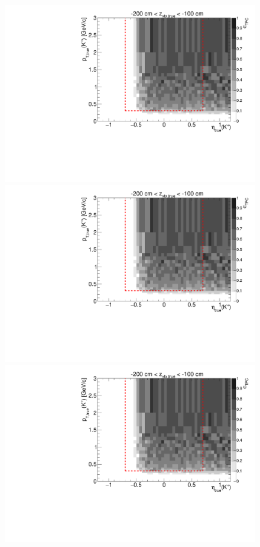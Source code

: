 \begin{figure}[hb]
{  \includegraphics[width=\linewidth,page=6]{graphics/eff/Eff2D_TPC_kaon_Plus.pdf}\\
  \includegraphics[width=\linewidth,page=8]{graphics/eff/Eff2D_TPC_kaon_Plus.pdf}\\
  \includegraphics[width=\linewidth,page=10]{graphics/eff/Eff2D_TPC_kaon_Plus.pdf}
}%
\end{figure}
